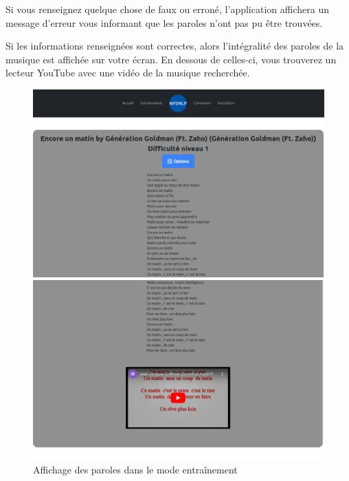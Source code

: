 \documentclass[12pt,french]{article}
\begin{document}
Si vous renseignez quelque chose de faux ou erroné, l'application affichera un message d'erreur vous informant que les paroles n'ont pas pu être trouvées.

Si les informations renseignées sont correctes, alors l'intégralité des paroles de la musique est affichée sur votre écran. En dessous de celles-ci, vous trouverez un lecteur YouTube avec une vidéo de la musique recherchée.

\begin{figure}[H]
	\centering
	\begin{minipage}{.5\textwidth}
		\centering
		\includegraphics[scale=0.15]{parole.png}
	\end{minipage}%
	\begin{minipage}{.5\textwidth}
		\centering
		\includegraphics[scale=0.15]{ytbparole.png}
	\end{minipage}
	\caption{Affichage des paroles dans le mode entraînement}
\end{figure}
\end{document}

